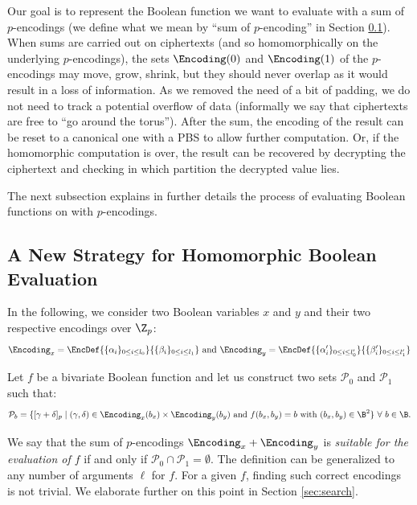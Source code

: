 Our goal is to represent the Boolean function we want to evaluate with a sum of $p$-encodings (we define what we mean by ``sum of $p$-encoding'' in Section \ref{sec:new_strategy}).  When sums are carried out on ciphertexts (and so homomorphically on the underlying $p$-encodings), the sets $\Encoding(0)$ and $\Encoding(1)$ of the $p$-encodings may move, grow, shrink, but they should never overlap as it would result in a loss of information. As we removed the need of a bit of padding, we do not need to track a potential overflow of data (informally we say that ciphertexts are free to ``go around the torus''). After the sum, the encoding of the result can be reset to a canonical one with a PBS to allow further computation. Or, if the homomorphic computation is over, the result can be recovered by decrypting the ciphertext and checking in which partition the decrypted value lies.


The next subsection explains in further details the process of evaluating Boolean functions on with $p$-encodings.



\subsection{A New Strategy for Homomorphic Boolean Evaluation}
\label{sec:new_strategy}



In the following, we consider two Boolean variables $x$ and $y$ and their two respective encodings over $\Z_p$: 
\begin{equation}
\Encoding_x = 
\EncDef{\{\alpha_i\}_{0 \le i \le l_0}}{\{\beta_i\}_{0 \le i \le l_1}} \text{ and } \Encoding_y = \EncDef{\{\alpha'_i\}_{0 \le i \le l'_0}}{\{\beta'_i\}_{0 \le i \le l'_1}}
\label{eq:encoding_definition}
\end{equation}


Let $f$ be a bivariate Boolean function and let us construct two sets $\mathcal{P}_0$ and $\mathcal{P}_1$ such that:
\begin{equation}
    \mathcal{P}_b = \{[\gamma + \delta]_p \mid (\gamma, \delta) \in \Encoding_x(b_x) \times \Encoding_y(b_y) \text{ and } f(b_x, b_y) = b \text{ with } (b_x, b_y) \in \B^2\}~\forall~b \in \B.
    \label{def:sets_p}
\end{equation}

We say that the sum of $p$-encodings $\Encoding_x + \Encoding_y$ is \emph{suitable for the evaluation of $f$} if and only if $\mathcal{P}_0 \cap \mathcal{P}_1 = \emptyset$. The definition can be generalized to any number of arguments $\ell$ for $f$. For a given $f$, finding such correct encodings is not trivial. We elaborate further on this point in Section \ref{sec:search}. 

